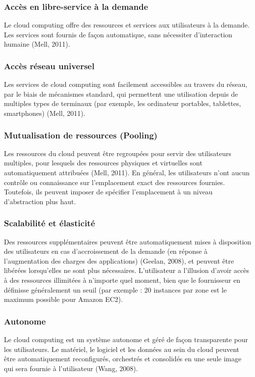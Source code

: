     \subsubsection{Accès en libre-service à la demande}
     Le cloud computing offre des ressources et services aux utilisateurs à la demande. Les services sont fournis de façon automatique, sans nécessiter d’interaction humaine (Mell, 2011). 
    \subsubsection{Accès réseau universel}
      Les services de cloud computing  sont facilement accessibles au travers du réseau, par le biais de mécanismes standard, qui permettent une utilisation depuis de multiples types de terminaux (par exemple, les ordinateur portables, tablettes, smartphones) (Mell, 2011). 
\subsubsection{Mutualisation de ressources (Pooling)}
 Les ressources du cloud peuvent être regroupées pour servir des utilisateurs multiples, pour lesquels des ressources physiques et virtuelles sont automatiquement attribuées (Mell, 2011). En général, les utilisateurs n’ont aucun contrôle ou connaissance sur l’emplacement exact des ressources fournies. Toutefois, ils peuvent imposer de spécifier l’emplacement à un niveau d’abstraction plus haut.
   \subsubsection{Scalabilité et élasticité} 
   Des ressources supplémentaires peuvent être automatiquement mises à disposition des utilisateurs en cas d’accroissement de la demande (en réponse à l'augmentation des charges des applications) (Geelan, 2008), et peuvent être libérées lorsqu’elles ne sont plus nécessaires. L’utilisateur a l’illusion d’avoir accès à des ressources illimitées à n'importe quel moment, bien que le fournisseur en définisse généralement un seuil (par exemple : 20 instances par zone est le maximum possible pour Amazon EC2).
   \subsubsection{Autonome}
    Le cloud computing  est un système autonome et géré de façon transparente pour les utilisateurs. Le matériel, le logiciel et les données au sein du cloud peuvent être 
    	automatiquement reconfigurés, orchestrés et consolidés en une seule image qui sera fournie à l’utilisateur (Wang, 2008).

